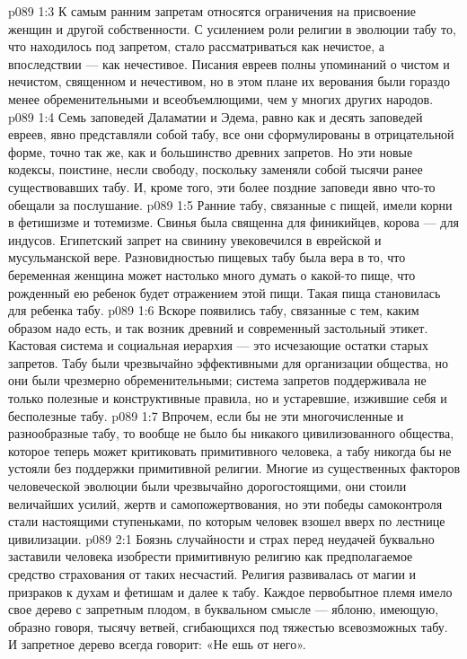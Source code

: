 \vs p089 1:3 К самым ранним запретам относятся ограничения на присвоение женщин и другой собственности. С усилением роли религии в эволюции табу то, что находилось под запретом, стало рассматриваться как нечистое, а впоследствии --- как нечестивое. Писания евреев полны упоминаний о чистом и нечистом, священном и нечестивом, но в этом плане их верования были гораздо менее обременительными и всеобъемлющими, чем у многих других народов.
\vs p089 1:4 Семь заповедей Даламатии и Эдема, равно как и десять заповедей евреев, явно представляли собой табу, все они сформулированы в отрицательной форме, точно так же, как и большинство древних запретов. Но эти новые кодексы, поистине, несли свободу, поскольку заменяли собой тысячи ранее существовавших табу. И, кроме того, эти более поздние заповеди явно что\hyp{}то обещали за послушание.
\vs p089 1:5 Ранние табу, связанные с пищей, имели корни в фетишизме и тотемизме. Свинья была священна для финикийцев, корова --- для индусов. Египетский запрет на свинину увековечился в еврейской и мусульманской вере. Разновидностью пищевых табу была вера в то, что беременная женщина может настолько много думать о какой\hyp{}то пище, что рожденный ею ребенок будет отражением этой пищи. Такая пища становилась для ребенка табу.
\vs p089 1:6 Вскоре появились табу, связанные с тем, каким образом надо есть, и так возник древний и современный застольный этикет. Кастовая система и социальная иерархия --- это исчезающие остатки старых запретов. Табу были чрезвычайно эффективными для организации общества, но они были чрезмерно обременительными; система запретов поддерживала не только полезные и конструктивные правила, но и устаревшие, изжившие себя и бесполезные табу.
\vs p089 1:7 Впрочем, если бы не эти многочисленные и разнообразные табу, то вообще не было бы никакого цивилизованного общества, которое теперь может критиковать примитивного человека, а табу никогда бы не устояли без поддержки примитивной религии. Многие из существенных факторов человеческой эволюции были чрезвычайно дорогостоящими, они стоили величайших усилий, жертв и самопожертвования, но эти победы самоконтроля стали настоящими ступеньками, по которым человек взошел вверх по лестнице цивилизации.
\vs p089 2:1 Боязнь случайности и страх перед неудачей буквально заставили человека изобрести примитивную религию как предполагаемое средство страхования от таких несчастий. Религия развивалась от магии и призраков к духам и фетишам и далее к табу. Каждое первобытное племя имело свое дерево с запретным плодом, в буквальном смысле --- яблоню, имеющую, образно говоря, тысячу ветвей, сгибающихся под тяжестью всевозможных табу. И запретное дерево всегда говорит: «Не ешь от него».
